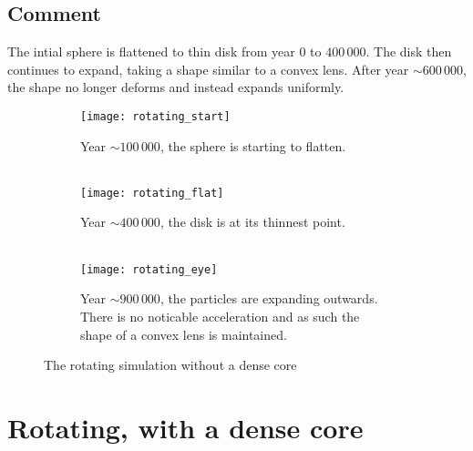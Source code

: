 \documentclass[../main.tex]{subfiles}
\begin{document}
\subsection{Comment}
The intial sphere is flattened to thin disk from year $0$ to $400 \, 000$. The disk then continues
to expand, taking a shape similar to a convex lens. After year $\sim 600 \, 000$, the shape no
longer deforms and instead expands uniformly.

\begin{figure}[p]
  \centering
  \begin{subfigure}[b]{0.495\linewidth}
    \texttt{[image: rotating\_start]}
    \caption{Year $\sim 100 \, 000$, the sphere is starting to flatten.\\\ }
  \end{subfigure}
  \begin{subfigure}[b]{0.495\linewidth}
    \texttt{[image: rotating\_flat]}
    \caption{Year $\sim 400 \, 000$, the disk is at its thinnest point.\\\ }
  \end{subfigure}
  \begin{subfigure}[b]{0.495\linewidth}
    \texttt{[image: rotating\_eye]}
    \caption{Year $\sim 900 \, 000$, the particles are expanding outwards. There is no noticable
    acceleration and as such the shape of a convex lens is maintained.}
  \end{subfigure}
  \caption{The rotating simulation without a dense core}
  \label{fig:coffee}
\end{figure}
\restoregeometry

\section{Rotating, with a dense core}
\end{document}
